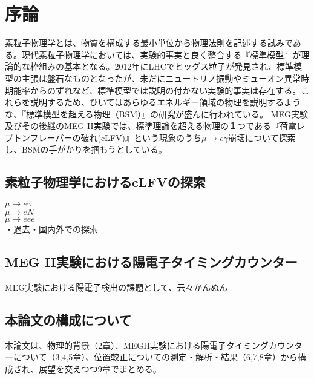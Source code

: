 \documentclass[Yonemoto_master.tex]{subfiles}
\begin{document}
\chapter{序論}
素粒子物理学とは、物質を構成する最小単位から物理法則を記述する試みである。現代素粒子物理学においては、実験的事実と良く整合する『標準模型』が理論的な枠組みの基本となる。2012年にLHCでヒッグス粒子が発見され、標準模型の主張は盤石なものとなったが、未だにニュートリノ振動やミューオン異常時期能率からのずれなど、標準模型では説明の付かない実験的事実は存在する。これらを説明するため、ひいてはあらゆるエネルギー領域の物理を説明するような、『標準模型を超える物理（BSM）』の研究が盛んに行われている。
MEG実験及びその後継のMEG II実験では、標準理論を超える物理の１つである『荷電レプトンフレーバーの破れ(cLFV)』という現象のうち$\mu \to e\gamma$崩壊について探索し、BSMの手がかりを掴もうとしている。

\section{素粒子物理学におけるcLFVの探索}
\noindent $\mu \to e\gamma$ \\
$\mu \to eN$ \\
$\mu \to eee$ \\
・過去・国内外での探索

\section{MEG II実験における陽電子タイミングカウンター}
MEG実験における陽電子検出の課題として、云々かんぬん

\section{本論文の構成について}
本論文は、物理的背景（2章）、MEGII実験における陽電子タイミングカウンターについて（3,4,5章）、位置較正についての測定・解析・結果（6,7,8章）から構成され、展望を交えつつ9章でまとめる。
\end{document}
